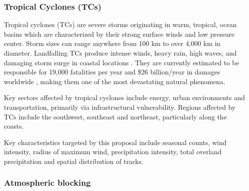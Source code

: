 \documentclass[11pt]{article}
\newcommand\citep{\cite}
\begin{document}
\subsubsection*{Tropical Cyclones (TCs)}

Tropical cyclones (TCs) are severe storms originating in warm, tropical, ocean basins which are characterized by their strong surface winds and low pressure center. Storm sizes can range anywhere from 100 km to over 4,000 km in diameter. Landfalling TCs produce intense winds, heavy rain, high waves, and damaging storm surge in coastal locations \citep{EmanuelDivineWind}. They are currently estimated to be responsible for 19,000 fatalities per year and \$26 billion/year in damages worldwide \citep{Mendelsohn2012}, making them one of the most devastating natural phenomena.



Key sectors affected by tropical cyclones include energy, urban environments and transportation, primarily via infrastructural vulnerability.  Regions affected by TCs include the southwest, southeast and northeast, particularly along the coasts.

Key characteristics targeted by this proposal include seasonal counts, wind intensity, radius of maximum wind, precipitation intensity, total overland precipitation and spatial distribution of tracks.

\subsubsection*{Atmospheric blocking}
\end{document}
